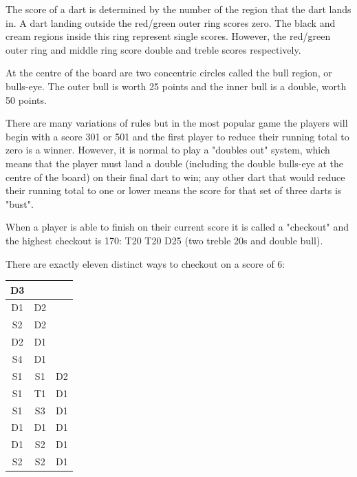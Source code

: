 The score of a dart is determined by the number of the region that the dart lands in. A dart landing outside the red/green outer ring scores zero. The black and cream regions inside this ring represent single scores. However, the red/green outer ring and middle ring score double and treble scores respectively.

At the centre of the board are two concentric circles called the bull region, or bulls-eye. The outer bull is worth 25 points and the inner bull is a double, worth 50 points.

There are many variations of rules but in the most popular game the players will begin with a score 301 or 501 and the first player to reduce their running total to zero is a winner. However, it is normal to play a "doubles out" system, which means that the player must land a double (including the double bulls-eye at the centre of the board) on their final dart to win; any other dart that would reduce their running total to one or lower means the score for that set of three darts is "bust".

When a player is able to finish on their current score it is called a "checkout" and the highest checkout is 170: T20 T20 D25 (two treble 20s and double bull).

\newpage

There are exactly eleven distinct ways to checkout on a score of 6:

\begin{center}
    \begin{tabular}{|c|c|c|}
        \hline
        D3 &    &   \\
        \hline
        D1 & D2 &\\
        \hline
        S2 & D2 &\\
        \hline
        D2 & D1 &\\
        \hline
        S4 & D1 &\\
        \hline
        S1 & S1 & D2\\
        \hline
        S1 & T1 & D1\\
        \hline
        S1 & S3 & D1\\
        \hline
        D1 & D1 & D1\\
        \hline
        D1 & S2 & D1\\
        \hline
        S2 & S2 & D1\\
        \hline
    \end{tabular}
\end{center}


